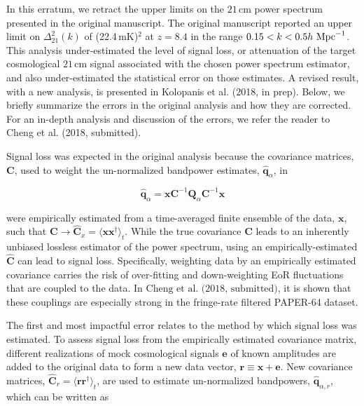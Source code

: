 \documentclass[onecolumn]{emulateapj} \shorttitle{}
\newcommand{\hMpci}{h\ {\rm Mpc}^{-1}}
\newcommand{\mKlimit}{(22.4\,\textrm{mK})$^2$ }
\newcommand{\kolopaniscitet}{\textrm{Kolopanis et al. (2018, in prep)}}
\newcommand{\chengcitet}{\textrm{Cheng et al. (2018, submitted)}}
\begin{document}
\maketitle

In this erratum, we retract the upper limits on the $21\,\textrm{cm}$ power spectrum
presented in the original manuscript.  The original manuscript reported an upper
limit on $\Delta_{21}^2(k)$ of \mKlimit at $z=8.4$ in the range
$0.15<k<0.5\hMpci$.  This analysis under-estimated the level of signal loss, or attenuation of
the target cosmological $21\,\textrm{cm}$ signal associated with the chosen power spectrum
estimator, and also under-estimated the statistical error on those estimates.
A revised result, with a new analysis, is presented in \kolopaniscitet.  Below,
we briefly summarize the errors in the original analysis and how they are
corrected. For an in-depth analysis and discussion of the errors, we refer the reader to
\chengcitet.

Signal loss was expected in the original analysis because the
covariance matrices, $\textbf{C}$, used to weight the un-normalized bandpower
estimates, ${\widehat{\textbf{q}}}_\alpha$, in

\begin{equation}
{\widehat{\textbf{q}}}_{\alpha} = {\mathbf x}\textbf{C}^{-1}\textbf{Q}_\alpha \textbf{C}^{-1}{\mathbf x}
\end{equation} 

\noindent were empirically estimated from a time-averaged finite ensemble of the data,
$\mathbf x$, such that $\mathbf{C}\rightarrow \widehat{\textbf{C}}_{x}=\langle {\mathbf x} {\mathbf x}^\dagger\rangle_{t}$.
While the true covariance $\textbf{C}$ leads to an inherently unbiased lossless estimator of the power spectrum, using an empirically-estimated $\widehat{\textbf{C}}$ can lead to signal loss. Specifically, weighting data by an empirically estimated covariance carries the risk of over-fitting and down-weighting EoR fluctuations that are coupled to the data. In $\chengcitet$, it is shown that these couplings are especially strong in the fringe-rate filtered PAPER-64 dataset.

The first and most impactful error relates to the method by which signal loss
was estimated.  To assess signal loss from the empirically estimated covariance matrix, different realizations of mock
cosmological signals $\mathbf e$ of known amplitudes are added to the original data to form a new data vector, 
${\mathbf r}\equiv{\mathbf x} + {\mathbf e}$.
New covariance matrices, 
$\widehat{\textbf{C}}_r=\langle{\mathbf r}\mathbf{r}^\dagger\rangle_{t}$, 
are used to estimate un-normalized bandpowers, 
${\widehat{\textbf{q}}}_{\alpha,r}$, which can be written as 
\end{document}
